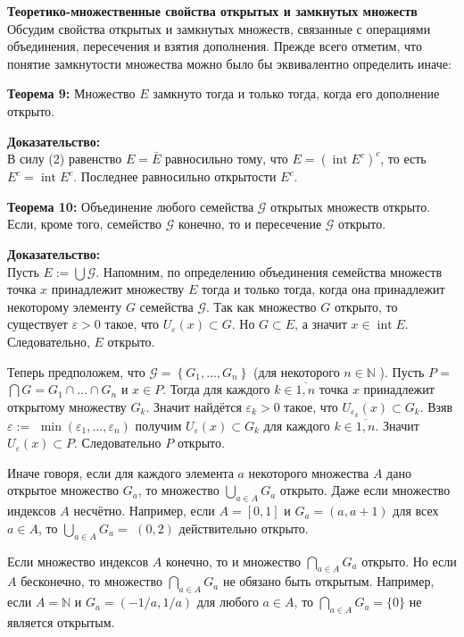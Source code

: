 \documentclass[a4paper,12pt]{article} %
\begin{document}
\textbf{Теоретико-множественные свойства открытых и замкнутых множеств}\\
Обсудим свойства открытых и замкнутых множеств, связанные с операциями объединения, пересечения и взятия дополнения. Прежде всего отметим, что понятие замкнутости множества можно было бы эквивалентно определить иначе:

\textbf{Теорема 9:} Множество $E$ замкнуто тогда и только тогда, когда его дополнение открыто.

\textbf{Доказательство:}\\
В силу (2) равенство $E=\bar{E}$ равносильно тому, что $E=\left(\operatorname{int} E^{c}\right)^{c}$, то есть $E^{c}=\operatorname{int} E^{c}$. Последнее равносильно открытости $E^{c}$.

\textbf{Теорема 10:} Объединение любого семейства $\mathscr{G}$ открытых множеств открыто. Если, кроме того, семейство $\mathscr{G}$ конечно, то и пересечение $\mathscr{G}$ открыто.

\textbf{Доказательство:}\\
Пусть $E:=\bigcup \mathscr{G}$. Напомним, по определению объединения семейства множеств точка $x$ принадлежит множеству $E$ тогда и только тогда, когда она принадлежит некоторому элементу $G$ семейства $\mathscr{G}$. Так как множество $G$ открыто, то существует $\varepsilon>0$ такое, что $U_{\varepsilon}(x) \subset G$. Но $G \subset E$, а значит $x \in \operatorname{int} E$. Следовательно, $E$ открыто.

Теперь предположем, что $\mathscr{G}=\left\{G_{1}, \ldots, G_{n}\right\}$ (для некоторого $n \in \mathbb{N}$ ). Пусть $P=$ $\bigcap G=G_{1} \cap \ldots \cap G_{n}$ и $x \in P$. Тогда для каждого $k \in \overline{1, n}$ точка $x$ принадлежит открытому множеству $G_{k}$. Значит найдётся $\varepsilon_{k}>0$ такое, что $U_{\varepsilon_{k}}(x) \subset G_{k}$. Взяв $\varepsilon:=$ $\min \left(\varepsilon_{1}, \ldots, \varepsilon_{n}\right)$ получим $U_{\varepsilon}(x) \subset G_{k}$ для каждого $k \in \overline{1, n}$. Значит $U_{\varepsilon}(x) \subset P$. Следовательно $P$ открыто.

Иначе говоря, если для каждого элемента $a$ некоторого множества $A$ дано открытое множество $G_{a}$, то множество $\bigcup_{a \in A} G_{a}$ открыто. Даже если множество индексов $A$ несчётно. Например, если $A=[0,1]$ и $G_{a}=(a, a+1)$ для всех $a \in A$, то $\bigcup_{a \in A} G_{a}=$ $(0,2)$ действительно открыто.

Если множество индексов $A$ конечно, то и множество $\bigcap_{a \in A} G_{a}$ открыто. Но если $A$ бесконечно, то множество $\bigcap_{a \in A} G_{a}$ не обязано быть открытым. Например, если $A=\mathbb{N}$ и $G_{a}=(-1 / a, 1 / a)$ для любого $a \in A$, то $\bigcap_{a \in A} G_{a}=\{0\}$ не является открытым.
\end{document}
